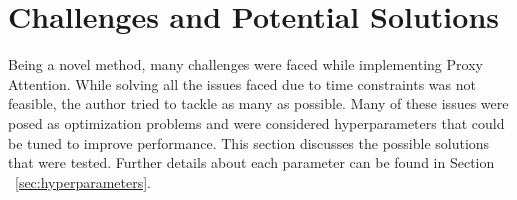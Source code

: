 






\section{Challenges and Potential Solutions}
Being a novel method, many challenges were faced while implementing Proxy Attention. While solving all the issues faced due to time constraints was not feasible, the author tried to tackle as many as possible. Many of these issues were posed as optimization problems and were considered hyperparameters that could be tuned to improve performance. This section discusses the possible solutions that were tested. Further details about each parameter can be found in Section ~\ref{sec:hyperparameters}.

